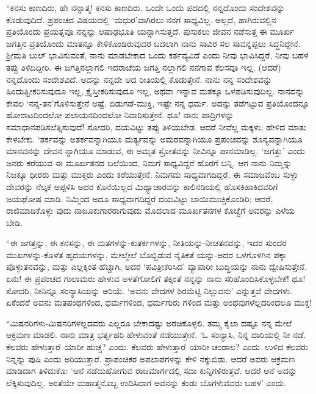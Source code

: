“ಕನಸು ಕಾಣದಿರು, ಹೇ ನನ್ನಾತ್ಮ! ಕನಸು ಕಾಣದಿರು. ಒಂದೇ ಒಂದು ಪದದಲ್ಲಿ ನನ್ನದೊಂದು ಸಂದೇಶವನ್ನು ಕೊಡುವುದಿದೆ. ಪ್ರಪಂಚದ ವಿಷಯದಲ್ಲಿ ‘ಮಧುರ’ವಾಗಿರಲು ನನಗೆ ಸಾಧ್ಯವಿಲ್ಲ. ಅಲ್ಲದೆ, ಹಾಗಿರುವಲ್ಲಿನ ಪ್ರತಿಯೊಂದು ಪ್ರಯತ್ನವೂ ನನ್ನನ್ನು ಆಷಾಢಭೂತಿ ಯನ್ನಾಗಿಸುತ್ತದೆ. ಪುಸುಕಲು ಜೀವನ ನಡೆಸುತ್ತ ಈ ಮೂರ್ಖ ಜಗತ್ತಿನ ಪ್ರತಿಯೊಂದು ಮಾತನ್ನೂ ಕೇಳಿಕೊಂಡಿರುವುದರ ಬದಲಾಗಿ ನಾನು ಸಾವಿರ ಸಲ ಸಾವನ್ನಪ್ಪಲು ಸಿದ್ಧನಿದ್ದೇನೆ. ಶ್ರೀಮತಿ ಬುಲ್ ಭಾವಿಸುವಂತೆ, ನಾನು ಮಾಡಬೇಕಾದ ಒಂದು ಕರ್ತವ್ಯವಿದೆ ಎಂದು ನೀವು ಭಾವಿಸಿದ್ದರೆ, ನೀವು ಬಹಳ ತಪ್ಪು ತಿಳಿದಿದ್ದೀರಿ. ಈ ಜಗತ್ತಿನಲ್ಲಾಗಲಿ ಇದರಾಚೆಯ ಜಗತ್ತಿ ನಲ್ಲಾಗಲಿ ನನಗಾವ ಕೆಲಸವೂ ಇಲ್ಲ. (ಆದರೆ) ನನ್ನದೊಂದು ಸಂದೇಶವಿದೆ. ಅದನ್ನು ನನ್ನದೇ ಆದ ರೀತಿಯಲ್ಲಿ ಕೊಡುತ್ತೇನೆ. ನಾನು ನನ್ನ ಸಂದೇಶವನ್ನು ಹಿಂದುತ್ವೀಕರಿಸುವುದೂ ಇಲ್ಲ, ಕ್ರೈಸ್ತೀಕರಿಸುವುದೂ ಇಲ್ಲ, ಅಥವಾ ಇನ್ನಾವ ಮತಕ್ಕೂ ಒಳಪಡಿಸುವುದಿಲ್ಲ. ನಾನದನ್ನು ಕೇವಲ ‘ನನ್ನ-ತನ’ಗೊಳಿಸುತ್ತೇನೆ ಅಷ್ಟೆ. ಬಿಡುಗಡೆ-ಮುಕ್ತಿ, ಇಷ್ಟೇ ನನ್ನ ಧರ್ಮ. ಅದನ್ನು ತಡೆಗಟ್ಟುವ ಪ್ರತಿಯೊಂದನ್ನೂ ಹೋರಾಟದಿಂದಲೋ ಪಲಾಯನದಿಂದಲೋ ನಿವಾರಿಸುತ್ತೇನೆ. ಥೂ! ನಾನು ಪಾದ್ರಿಗಳನ್ನು ಸಮಾಧಾನಪಡಿಸಲೆತ್ನಿಸುವುದೆ! ಸೋದರಿ, ದಯವಿಟ್ಟು ತಪ್ಪು ತಿಳಿಯಬೇಡ. ಆದರೆ ನೀವೆಲ್ಲ ಮಕ್ಕಳು; ಹೇಳಿದ ಮಾತು ಕೇಳಬೇಕು. ‘ತರ್ಕವನ್ನು ಅತರ್ಕವನ್ನಾಗಿಯೂ ಮರ್ತ್ಯವನ್ನು ಅಮರವನ್ನಾಗಿಯೂ ಪ್ರಪಂಚವನ್ನು ಶೂನ್ಯವನ್ನಾಗಿಯೂ ಮಾನವನನ್ನು ದೇವನ ನ್ನಾಗಿಯೂ ಮಾಡುವ, ಈ ಅಮೃತ ಸ್ರೋತವನ್ನು ನೀವಿನ್ನೂ ಪಾನಮಾಡಿಲ್ಲ. ‘ಜಗತ್ತು’ ಎಂದು ಜನರು ಕರೆಯುವ ಈ ಮೂರ್ಖತನದ ಬಲೆಯಿಂದ, ನಿಮಗೆ ಸಾಧ್ಯವಿದ್ದರೆ ಹೊರಗೆ ಬನ್ನಿ. ಆಗ ನಾನು ನಿಮ್ಮನ್ನು ನಿಜಕ್ಕೂ ಧೀರರು ಮತ್ತು ಮುಕ್ತರು ಎಂದು ಕರೆಯುತ್ತೇನೆ. ನಿಮಗದು ಸಾಧ್ಯವಾಗದಿದ್ದರೆ, ಈ ಸಮಾಜವೆಂಬ ಸುಳ್ಳು ದೇವರನ್ನು ನೆಲ್ಕಕೆ ಅಪ್ಪಳಿಸಿ ಅದರ ಕೊನೆಯಿಲ್ಲದ ಮಿಥ್ಯಾಚಾರವನ್ನು ಕಾಲಿನಡಿಯಲ್ಲಿ ಹೊಸಕಿಹಾಕಿದವರಿಗೆ ಜಯಘೋಷ ಮಾಡಿ. ನಿಮ್ಮಿಂದ ಅದೂ ಸಾಧ್ಯವಾಗದಿದ್ದರೆ ದಯವಿಟ್ಟು ಬಾಯಿಮುಚ್ಚಿಕೊಂಡಿರಿ; ಆದರೆ, ರಾಜಿಮಾಡಿಕೊಳ್ಳು ವುದು ನಾಜೂಕುಗಾರರಾಗುವುದು ಮೊದಲಾದ ಮೂರ್ಖತನಗಳ ಕೊಚ್ಚೆಗೆ ಅವರನ್ನು ಎಳೆಯ ಬೇಡಿ.

“ಈ ಜಗತ್ತನ್ನು, ಈ ಕನಸನ್ನು, ಈ ಮತಗಳನ್ನು-ಕುತರ್ಕಗಳನ್ನು, ನೀತಿಯನ್ನು-ನೀಚತನವನ್ನು, ಇದರ ಸುಂದರ ಮುಖಗಳನ್ನು-ಕೊಳೆತ ಹೃದಯಗಳನ್ನು, ಮೇಲ್ಮೇಲೆ ಬೊಬ್ಬಿಡುವ ನೈತಿಕತೆ ಯನ್ನು-ಅದರ ಒಳಗೊಳಗಿನ ಪಕ್ಕಾ ಪೊಳ್ಳುತನವನ್ನು, ಮತ್ತು ಎಲ್ಲಕ್ಕಿಂತ ಹೆಚ್ಚಾಗಿ, ಅದರ ‘ಪವಿತ್ರೀಕರಿಸಿದ’ ವ್ಯಾಪಾರೀ ಬುದ್ಧಿಯನ್ನು ನಾನು ದ್ವೇಷಿಸುತ್ತೇನೆ. ಏನು! ಈ ಪ್ರಪಂಚದ ಗುಲಾಮರು ಹೇಳುವ ಅಳತೆಗೋಲಿಗೆ ತಕ್ಕಂತೆ ನನ್ನನ್ನು ನಾನು ಸರಿಹೊಂದಿಸಿಕೊಳ್ಳಬೇಕೆ! ಥೂ! ಸೋದರಿ, ನೀನಿನ್ನೂ ಸಂನ್ಯಾಸಿಯನ್ನು ಅರಿಯೆ. ‘ಅವನು ವೇದಗಳ ಶಿರಮೆಟ್ಟಿ ನಿಲ್ಲುವನು’ ಎನ್ನುತ್ತವೆ ವೇದಗಳು. ಏಕೆಂದರೆ ಅವನು ಮತಪಂಥಗಳಿಂದ, ಧರ್ಮಗಳಿಂದ, ಧರ್ಮಗುರು ಗಳಿಂದ ಮತ್ತು ಅಂಥವುಗಳೆಲ್ಲದರಿಂದಲೂ ಮುಕ್ತ!

“ಮಿಷನರಿಗಳು-ಮಿಷನರಿಗಳಲ್ಲದವರು ಎಲ್ಲರೂ ಬೇಕಾದಷ್ಟು ಅರಚಿಕೊಳ್ಳಲಿ. ತಮ್ಮ ಕೈಲಾ ದಷ್ಟೂ ನನ್ನ ಮೇಲೆ ಆಕ್ರಮಣ ಮಾಡಲಿ. ನಾನು ಮಾತ್ರ ಭರ್ತೃಹರಿ ಹೇಳುವಂತೆ ನಡೆಯುತ್ತೇನೆ. ‘ಓ ಸಂನ್ಯಾಸಿ, ನಿನ್ನ ದಾರಿಯಲ್ಲಿ ನೀ ನಡೆ. ಕೆಲವರು ಹೇಳುತ್ತಾರೆ–ಯಾರೀ ಹುಚ್ಚ? ಎಂದು. ಕೆಲವರು ಹೇಳುತ್ತಾರೆ–ಯಾರೀ ಚಂಡಾಲ? ಎಂದು. ಉಳಿದ ಕೆಲವರು ನಿನ್ನನ್ನು ಪುಷಿ ಎಂದು ಅರಿಯುತ್ತಾರೆ. ಪ್ರಾಪಂಚಿಕರ ಅಪಲಾಪಗಳನ್ನು ಕೇಳಿ ನಕ್ಕುಬಿಡು. ಆದರೆ ಅವರು ಆಕ್ರಮಣ ಮಾಡಿದಾಗ ತಿಳಿದುಕೊ: ‘ಆನೆ ನಡೆದುಹೋಗುವ ರಾಜಮಾರ್ಗದಲ್ಲಿ ಸದಾ ಕುನ್ನಿಗಳಿರುತ್ತವೆ. ಆದರೆ ಆನೆ ಅದನ್ನು ಲೆಕ್ಕಿಸುವುದಿಲ್ಲ. ಅಂತೆಯೇ ಮಹಾತ್ಮನೊಬ್ಬ ಉದಿಸಿದಾಗ ಅವನನ್ನು ಕಂಡು ಬೊಗಳುವವರು ಬಹಳ’ ಎಂದು.

